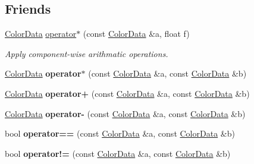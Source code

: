 \subsection*{Friends}
\begin{DoxyCompactItemize}
\item 
\hypertarget{classColorData_adf9a770243996e50282d248a4327f351}{\hyperlink{classColorData}{Color\-Data} \hyperlink{classColorData_adf9a770243996e50282d248a4327f351}{operator$\ast$} (const \hyperlink{classColorData}{Color\-Data} \&a, float f)}\label{classColorData_adf9a770243996e50282d248a4327f351}

\begin{DoxyCompactList}\small\item\em Apply component-\/wise arithmatic operations. \end{DoxyCompactList}\item 
\hypertarget{classColorData_afdc3e8e6338798779739352e6bdfa42b}{\hyperlink{classColorData}{Color\-Data} {\bfseries operator$\ast$} (const \hyperlink{classColorData}{Color\-Data} \&a, const \hyperlink{classColorData}{Color\-Data} \&b)}\label{classColorData_afdc3e8e6338798779739352e6bdfa42b}

\item 
\hypertarget{classColorData_afee00faf26189979b72f3854a17200ae}{\hyperlink{classColorData}{Color\-Data} {\bfseries operator+} (const \hyperlink{classColorData}{Color\-Data} \&a, const \hyperlink{classColorData}{Color\-Data} \&b)}\label{classColorData_afee00faf26189979b72f3854a17200ae}

\item 
\hypertarget{classColorData_a799bd54f65a61569b5b968062ac0d37e}{\hyperlink{classColorData}{Color\-Data} {\bfseries operator-\/} (const \hyperlink{classColorData}{Color\-Data} \&a, const \hyperlink{classColorData}{Color\-Data} \&b)}\label{classColorData_a799bd54f65a61569b5b968062ac0d37e}

\item 
\hypertarget{classColorData_a9dae9e77610393d100312c9d248f09cc}{bool {\bfseries operator==} (const \hyperlink{classColorData}{Color\-Data} \&a, const \hyperlink{classColorData}{Color\-Data} \&b)}\label{classColorData_a9dae9e77610393d100312c9d248f09cc}

\item 
\hypertarget{classColorData_a698ac263a286afe37e3b9ed0c5882c8c}{bool {\bfseries operator!=} (const \hyperlink{classColorData}{Color\-Data} \&a, const \hyperlink{classColorData}{Color\-Data} \&b)}\label{classColorData_a698ac263a286afe37e3b9ed0c5882c8c}

\end{DoxyCompactItemize}


